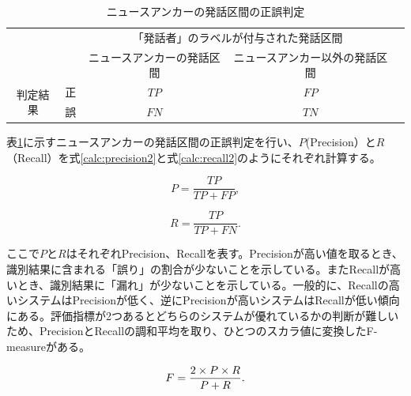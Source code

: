 \begin{table}[H]
\begin{center}
    \caption{ニュースアンカーの発話区間の正誤判定 \label{table:clustering}}
\begin{tabular}{|c|c|c|c|l}
\cline{1-4}
\multicolumn{2}{|c|}{\multirow{2}{*}{}} & \multicolumn{2}{c|}{「発話者」のラベルが付与された発話区間} &  \\ \cline{3-4}
\multicolumn{2}{|c|}{}                  & ニュースアンカーの発話区間        & ニュースアンカー以外の発話区間        &  \\ \cline{1-4}
\multirow{2}{*}{判定結果}        & 正        & $TP$                  & $FP$                   &  \\ \cline{2-4}
& 誤        & $FN$                  & $TN$                   &  \\ \cline{1-4}
\end{tabular}
\end{center}
\end{table}

表\ref{table:clustering}に示すニュースアンカーの発話区間の正誤判定を行い、$P$(Precision）と$R$（Recall）を式\ref{calc:precision2}と式\ref{calc:recall2}のようにそれぞれ計算する。

\begin{equation}
\label{calc:precision2}
P = \frac{TP}{TP + FP},
\end{equation}

\begin{equation}
\label{calc:recall2}
R = \frac{TP}{TP + FN}.
\end{equation}

ここで$P$と$R$はそれぞれPrecision、Recallを表す。Precisionが高い値を取るとき、識別結果に含まれる「誤り」の割合が少ないことを示している。またRecallが高いとき、識別結果に「漏れ」が少ないことを示している。一般的に、Recallの高いシステムはPrecisionが低く、逆にPrecisionが高いシステムはRecallが低い傾向にある。評価指標が2つあるとどちらのシステムが優れているかの判断が難しいため、PrecisionとRecallの調和平均を取り、ひとつのスカラ値に変換したF-measureがある。

\begin{equation}
\label{calc:fmeasure}
F = \frac{2 \times P \times R}{P + R}. \notag
\end{equation}

